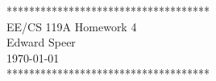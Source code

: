 \documentclass{article}
\newcommand{\HWNUM}{4}
\begin{document}
    \begin{center}
        ************************************ \\
        EE/CS 119A Homework \HWNUM \\
        Edward Speer \\
        \today \\
        ************************************
    \end{center}
    \begin{small}
        
        \pagebreak
        
        \pagebreak
        
    \end{small}
\end{document}
